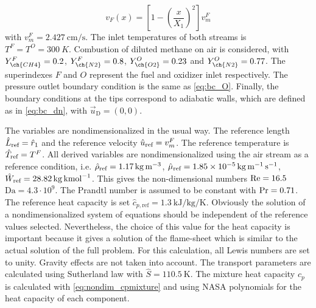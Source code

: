 \begin{equation}
	v_F(x) = \left[1-\left(\frac{x}{X_1}\right)^2\right]v_m^F
\end{equation}
with $v^F_m = \SI{2.427}{\centi \meter \per \second}$.  The inlet temperatures of both streams is  $T^F = T^O = \SI{300}{K}$. Combustion of diluted methane on air is considered, with $Y^F_{\ch{CH4}} = 0.2$, $Y^F_{\ch{N2}} = 0.8$, $Y^O_{\ch{O2}} = 0.23$ and $Y^O_{\ch{N2}} = 0.77$. The superindexes $F$ and $O$ represent the fuel and oxidizer inlet respectively. The pressure outlet boundary condition is the same as \cref{eq:bc_O}. Finally, the boundary conditions at the tips correspond to adiabatic walls, which are defined as in \cref{eq:bc_dn}, with $\vec{u}_{\text{D}} = (0,0)$.             

The variables are nondimensionalized in the usual way. The reference length $\hat L_{\text{ref}} = \hat{r}_1$ and the reference velocity $\hat u_{\text{ref}} =v^F_m$. The reference temperature is $\hat T_{\text{ref}} = T^F$.  All derived variables are nondimensionalized using the air stream as a reference condition, i.e. $\hat \rho_{\text{ref}} = \SI{1.17}{\kilo \gram \per \cubic \meter}$, $\hat \mu_{\text{ref}} = \SI{1.85e-5}{\kilo \gram \per \meter \per \second}$,$\hat W_{\text{ref}} = \SI{28.82}{\kilo \gram \per \kilo\mole}$. This gives the non-dimensional numbers $\text{Re} = 16.5$ $\text{Da} = 4.3\cdot 10^9$. The Prandtl number is assumed to be constant with $\text{Pr} = 0.71$. The reference heat capacity is set $\hat{c}_{p,\text{ref}}= \SI{1.3}{\kilo \joule \per \kilo \gram \per \kelvin}$. Obviously the solution of a nondimensionalized system of equations should be independent of the reference values selected. Nevertheless, the choice of this value for the heat capacity is important because it gives a solution of the flame-sheet which is similar to the actual solution of the full problem. For this calculation, all Lewis numbers are set to unity. Gravity effects are not taken into account. The transport parameters are calculated using Sutherland law with $\hat{S} = \SI{110.5}{\kelvin}$. The mixture heat capacity $c_p$ is calculated with \cref{eq:nondim_cpmixture} and using NASA polynomials for the heat capacity of each component.

